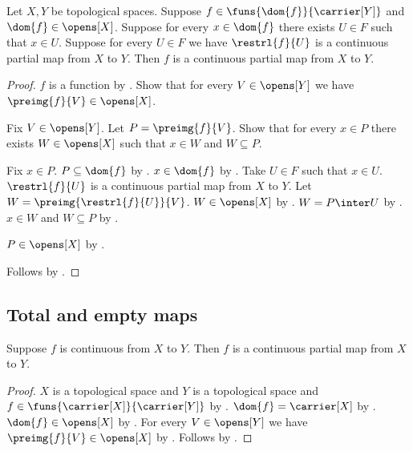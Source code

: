 \begin{theorem}\label{continuous_partial_map_locality}
    Let $X,Y$ be topological spaces.
    Suppose $f\in\funs{\dom{f}}{\carrier[Y]}$ and $\dom{f}\in\opens[X]$.
    Suppose for every $x\in\dom{f}$ there exists $U\in F$ such that $x\in U$.
    Suppose for every $U\in F$ we have
        $\restrl{f}{U}$ is a continuous partial map from $X$ to $Y$.
    Then $f$ is a continuous partial map from $X$ to $Y$.
\end{theorem}
\begin{proof}
    $f$ is a function by .
    Show that for every $V\in\opens[Y]$ we have $\preimg{f}{V}\in\opens[X]$.
    \begin{subproof}
        Fix $V\in\opens[Y]$.
        Let $P=\preimg{f}{V}$.
        Show that for every $x\in P$ there exists $W\in\opens[X]$ such that
            $x\in W$ and $W\subseteq P$.
        \begin{subproof}
            Fix $x\in P$.
            $P\subseteq\dom{f}$ by .
            $x\in\dom{f}$ by .
            Take $U\in F$ such that $x\in U$.
            $\restrl{f}{U}$ is a continuous partial map from $X$ to $Y$.
            Let $W=\preimg{\restrl{f}{U}}{V}$.
            $W\in\opens[X]$ by .
            $W=P\inter U$ by .
            $x\in W$ and $W\subseteq P$ by .
        \end{subproof}
        $P\in\opens[X]$ by .
    \end{subproof}
    Follows by .
\end{proof}

\subsection{Total and empty maps}

\begin{theorem}\label{continuous_map_is_partial}
    Suppose $f$ is continuous from $X$ to $Y$.
    Then $f$ is a continuous partial map from $X$ to $Y$.
\end{theorem}
\begin{proof}
    $X$ is a topological space and $Y$ is a topological space and
        $f\in\funs{\carrier[X]}{\carrier[Y]}$ by .
    $\dom{f}=\carrier[X]$ by .
    $\dom{f}\in\opens[X]$ by .
    For every $V\in\opens[Y]$ we have $\preimg{f}{V}\in\opens[X]$ by
        .
    Follows by .
\end{proof}

